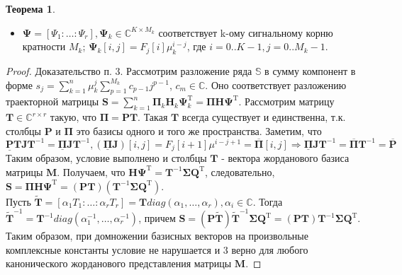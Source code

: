 \documentclass[specialist,
               substylefile = spbu_report.rtx,
               subf,href,colorlinks=true, 12pt]{disser}
\theoremstyle{definition}
\newtheorem{theorem}{Теорема}
\begin{document}
\begin{theorem}
\begin{enumerate}
\begin{itemize}
            \item $\mathbf{\Psi} = [\Psi_1: \ldots :\Psi_r], \mathbf{\Psi}_k \in \mathbb{C}^{K \times M_k}$ соответствует k-ому сигнальному корню кратности $M_k$; $\mathbf{\Psi}_k[i, j] = F_j[i]\mu_k^{i - j}$, где $i = 0..K-1, j = 0..M_k-1$.
        \end{itemize}
    \end{enumerate}

\end{theorem}
\begin{proof}
Доказательство п. 3. Рассмотрим разложение ряда $\mathbb{S}$ в сумму компонент в форме $s_j = \sum_{k = 1}^{n} \mu_k^j \sum_{p = 1}^{M_k} c_{p - 1}j^{p - 1}$, $c_m \in \mathbb{C}$. Оно соответствует разложению траекторной матрицы $\mathbf{S} = \sum_{k = 1}^{n}\mathbf{\Pi}_k\mathbf{H}_k \mathbf{\Psi}_k^{\mathrm{T}} = \mathbf{\Pi H\Psi}^{\mathrm{T}}$. Рассмотрим матрицу $\mathbf{T} \in \mathbb{C}^{r \times r}$ такую, что $\mathbf{\Pi} = \mathbf{PT}$. Такая $\mathbf{T}$ всегда существует и единственна, т.к. столбцы $\mathbf{P}$ и $\mathbf{\Pi}$ это базисы одного и того же пространства. Заметим, что 
\begin{equation*}
   \underline{\mathbf{P}}\mathbf{TJ}\mathbf{T}^{-1}
   = \underline{\mathbf{\Pi}}\mathbf{JT}^{-1},
   ( \underline{\mathbf{\Pi}}\mathbf{J})[i, j] = F_j[i + 1]\mu^{i - j + 1} = \overline{\mathbf{\Pi}}[i, j] \Rightarrow
\underline{\mathbf{\Pi}}\mathbf{JT}^{-1} =    \overline{\mathbf{\Pi}}\mathbf{T}^{-1} = \overline{\mathbf{P}}
\end{equation*}
Таким образом, условие выполнено и столбцы $\mathbf{T}$ - вектора жорданового базиса матрицы $\mathbf{M}$.
Получаем, что $\mathbf{H\Psi}^{\mathrm{T}} = \mathbf{T}^{-1}\mathbf{\Sigma Q}^{\mathrm{T}}$, следовательно, $\mathbf{S} = \mathbf{\Pi H\Psi}^{\mathrm{T}} = (\mathbf{PT})(\mathbf{T}^{-1}\mathbf{\Sigma Q}^{\mathrm{T}})$. \\
\hspace*{0.5cm} Пусть $\widetilde{\mathbf{T}} = [\alpha_1T_1: \dots :\alpha_rT_r] = \mathbf{T}diag(\alpha_1, \dots ,\alpha_r), \alpha_i \in \mathbb{C}$. Тогда\\ $\widetilde{\mathbf{T}}^{-1} = \mathbf{T}^{-1}diag(\alpha_1^{-1}, \dots ,\alpha_r^{-1})$, причем $\mathbf{S} = (\mathbf{P}\widetilde{\mathbf{T}})\widetilde{\mathbf{T}}^{-1}\mathbf{\Sigma Q}^{\mathrm{T}} = (\mathbf{P}\mathbf{T})\mathbf{T}^{-1}\mathbf{\Sigma Q}^{\mathrm{T}}$. Таким образом, при домножении базисных векторов
на произвольные комплексные константы условие не нарушается и 3
верно для любого канонического жорданового представления матрицы $\mathbf{M}$.
\end{proof}
\end{document}
